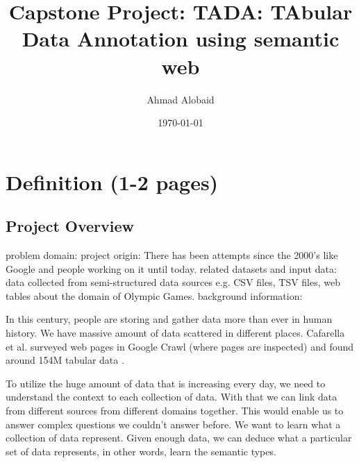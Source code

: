 \documentclass{article}
\title{Capstone Project: TADA: TAbular Data Annotation using semantic web}
\author{Ahmad Alobaid}
\date{\today}
\newcommand{\note}[2][inline]{\color{blue} #2 \color{black}}
\newcommand{\crossout}[2][inline]{\color{red}\st{#2}\color{black}}
\begin{document}
 
\maketitle
 
\tableofcontents

\clearpage
\section{Definition (1-2 pages)}

\subsection{Project Overview}
\note{problem domain:
project origin: There has been attempts since the 2000's like Google and people working on it until today.
related datasets and input data: data collected from semi-structured data sources e.g. CSV files, TSV files, web tables about the domain of Olympic Games.
background information: 

}

In this century, people are storing and gather data more than ever in human history. We have massive amount of data scattered in different places. Cafarella et al. surveyed web pages in Google Crawl (where pages are inspected) and found around 154M tabular data \cite{webtables-power-2008}.



To utilize the huge amount of data that is increasing every day, we need to understand the context to each collection of data. 
With that we can link data from different sources from different domains together. This would enable us to answer complex questions we couldn't answer before.
We want to learn what a collection of data represent. Given enough data, we can deduce what a particular set of data represents, in other words, learn the semantic types. 
\end{document}

